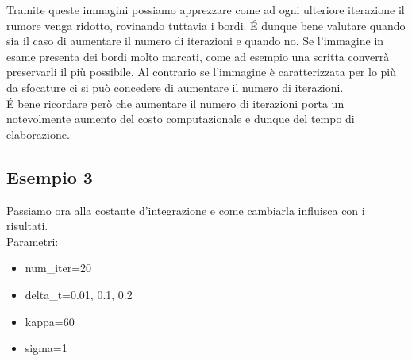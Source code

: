 Tramite queste immagini possiamo apprezzare come ad ogni ulteriore iterazione il rumore venga ridotto, rovinando tuttavia i bordi. \'E dunque bene valutare quando sia il caso di aumentare il numero di iterazioni e quando no. Se l'immagine in esame presenta dei bordi molto marcati, come ad esempio una scritta converrà preservarli il più possibile. Al contrario se l'immagine è caratterizzata per lo più da sfocature ci si può concedere di aumentare il numero di iterazioni.\\
\'E bene ricordare però che aumentare il numero di iterazioni porta un notevolmente aumento del costo computazionale e dunque del tempo di elaborazione.

\newpage
\subsection{Esempio 3}
Passiamo ora alla costante d'integrazione e come cambiarla influisca con i risultati.\\
Parametri:
\begin{itemize}
    \item num\_iter=20
    \item delta\_t=0.01, 0.1, 0.2
    \item kappa=60
    \item sigma=1
\end{itemize}

